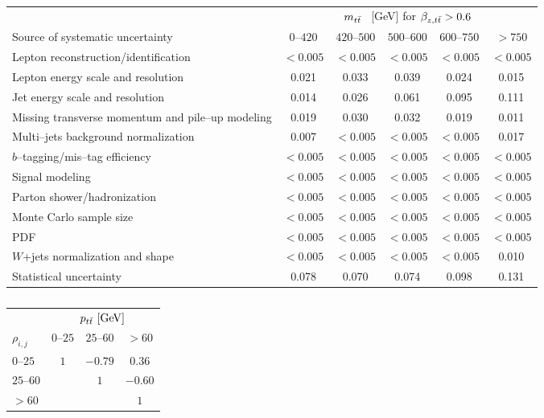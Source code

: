 \begin{table}[!htbp]\centering
\begin{tabular}{l c c c c c}
\toprule
 &\multicolumn{5}{c}{$m_{t\bar{t}}{}$ ~[GeV] for $\beta_{z,t\bar{t}} > 0.6$}    \\
Source of systematic uncertainty           &         $0$--$420$ & $420$--$500$      & $500$--$600$         & $600$--$750$      &   $>750$ \\
\midrule
Lepton reconstruction/identification              & $<0.005$ & $<0.005$ & $<0.005$ & $<0.005$ & $<0.005$  \\
Lepton energy scale and resolution                & 0.021 & 0.033 & 0.039 & 0.024 & 0.015 \\
Jet energy scale and resolution                   & 0.014 & 0.026 & 0.061 & 0.095 & 0.111 \\
Missing transverse momentum and pile--up modeling & 0.019 & 0.030 & 0.032 & 0.019 & 0.011 \\
Multi--jets background normalization    & 0.007 & $<0.005$ & $<0.005$ & $<0.005$ & 0.017 \\
$b$--tagging/mis--tag efficiency                & $<0.005$ & $<0.005$ & $<0.005$ & $<0.005$ & $<0.005$ \\
Signal modeling                        & $<0.005$ & $<0.005$ & $<0.005$ & $<0.005$ & $<0.005$ \\
Parton shower/hadronization             & $<0.005$ & $<0.005$ & $<0.005$ & $<0.005$ & $<0.005$ \\
Monte Carlo sample size                 & $<0.005$ & $<0.005$ & $<0.005$ & $<0.005$ & $<0.005$ \\
PDF                                     & $<0.005$ & $<0.005$ & $<0.005$ & $<0.005$ & $<0.005$ \\
$W$+jets normalization and shape        & $<0.005$ & $<0.005$ & $<0.005$ & $<0.005$ & 0.010 \\
\midrule
Statistical uncertainty                    & 0.078             &        0.070      &        0.074      &       0.098       &         0.131     \\
\bottomrule
\end{tabular}
\caption{}
\label{table:Systematics_mtt_beta}
\end{table}


\begin{table}[!htp]\centering
\begin{tabular}{l c c c }
  \toprule
  &\multicolumn{3}{c}{$p_{t\bar{t}}{}~[\rm{GeV}]$}    \\
  $\rho_{i,j}$      &     $0$--$25$           &        $25$--$60$         &  $>60$            \\
  \midrule
  $0$--$25$       &    $1$    &    $-0.79$  &   $0.36$  \\
  $25$--$60$      &           &    $1$      &   $-0.60$ \\
  $>60$           &           &             &   $1$     \\
  \bottomrule
\end{tabular}
\caption{ }
\label{tab:corr_pttt}
\end{table}

